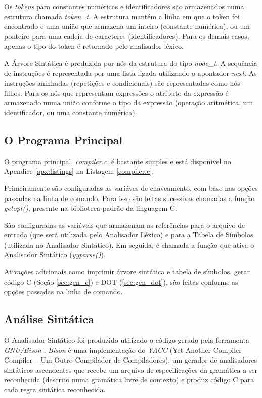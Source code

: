 Os \emph{tokens} para constantes numéricas e identificadores são armazenados
numa estrutura chamada \emph{token\_t}. A estrutura mantém a linha em que o token
foi encontrado e uma união que armazena um inteiro (constante numérica), ou um
ponteiro para uma cadeia de caracteres (identificadores). Para os demais
casos, apenas o tipo do token é retornado pelo analisador léxico.

A Árvore Sintática é produzida por nós da estrutura do tipo \emph{node\_t}. A
sequência de instruções é representada por uma lista ligada utilizando o
apontador \emph{next}. As instruções aninhadas (repetições e condicionais) são
representadas como nós filhos. Para os nós que representam expressões o
atributo da expressão é armazenado numa união conforme o tipo da expressão
(operação aritmética, um identificador, ou uma constante numérica).

\subsection{O Programa Principal}
O programa principal, \emph{compiler.c}, é bastante simples e está disponível
no Apendice \ref{apx:listings} na Listagem \ref{compiler.c}.

Primeiramente são configuradas as variáves de chaveamento, com base nas opções
passadas na linha de comando. Para isso são feitas sucessivas chamadas a
função \emph{getopt()}, presente na biblioteca-padrão da linguagem C.

São configuradas as variáveis que armazenam as referências para o arquivo de
entrada (que será utilizada pelo Analisador Léxico) e para a Tabela de
Símbolos (utilizada no Analisador Sintático). Em seguida, é chamada a função
que ativa o Analisador Sintático (\emph{yyparse()}).

Ativações adicionais como imprimir árvore sintática e tabela de símbolos,
gerar código C (Seção \ref{sec:gen_c}) e DOT (\ref{sec:gen_dot}), são feitas
conforme as opções passadas na linha de comando.


\subsection{Análise Sintática}
O Analisador Sintático foi produzido utilizado o código gerado pela ferramenta
\emph{GNU/Bison} \cite{bison}. \emph{Bison} é uma implementação do \emph{YACC}
(Yet Another Compiler Compiler {--} Um Outro Compilador de Compiladores), um
gerador de analisadores sintáticos ascendentes que recebe um arquivo de
especificações da gramática a ser reconhecida (descrito numa gramática livre
de contexto) e produz código C para cada regra sintática reconhecida.

